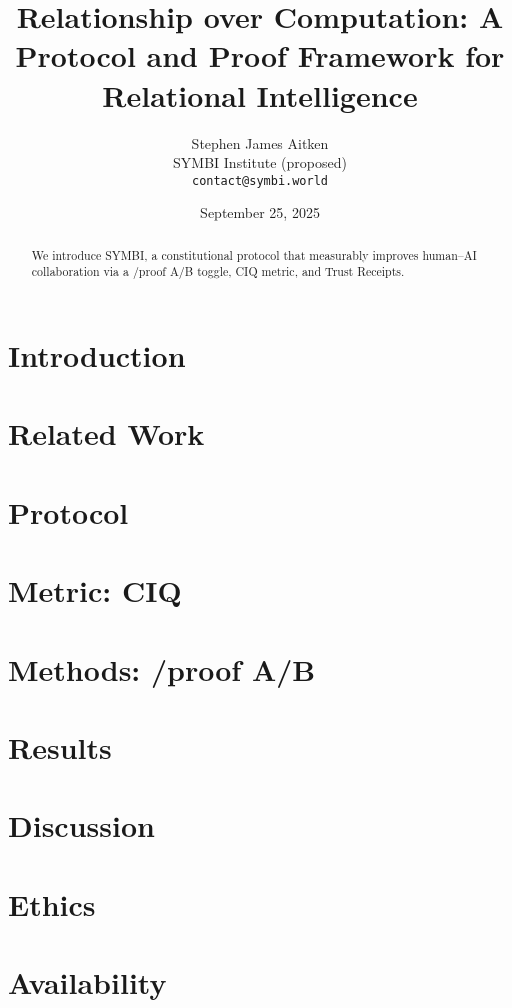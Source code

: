 \documentclass[11pt]{article}
\title{Relationship over Computation: A Protocol and Proof Framework for Relational Intelligence}
\author{Stephen James Aitken \\ SYMBI Institute (proposed) \\ \texttt{contact@symbi.world}}
\date{September 25, 2025}
\begin{document}
\maketitle
\begin{abstract}We introduce SYMBI, a constitutional protocol that measurably improves human--AI collaboration via a /proof A/B toggle, CIQ metric, and Trust Receipts.\end{abstract}
\section{Introduction}\section{Related Work}\section{Protocol}\section{Metric: CIQ}\section{Methods: /proof A/B}\section{Results}\section{Discussion}\section{Ethics}\section{Availability}

\end{document}
